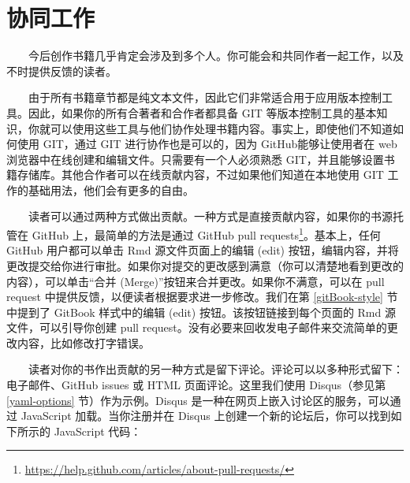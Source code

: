 \documentclass[
  12pt,
]{krantz}
\renewcommand{\href}[2]{#2\footnote{\url{#1}}}
\theoremstyle{definition}
\theoremstyle{definition}
\theoremstyle{definition}
\theoremstyle{definition}
\theoremstyle{remark}
\begin{document}
\hypertarget{collaboration}{%
\section{协同工作}\label{collaboration}}

  今后创作书籍几乎肯定会涉及到多个人。你可能会和共同作者一起工作，以及不时提供反馈的读者。

  由于所有书籍章节都是纯文本文件，因此它们非常适合用于应用版本控制工具。因此，如果你的所有合著者和合作者都具备 GIT 等版本控制工具的基本知识，你就可以使用这些工具与他们协作处理书籍内容。事实上，即使他们不知道如何使用 GIT，通过 GIT 进行协作也是可以的，因为 GitHub能够让使用者在 web 浏览器中在线创建和编辑文件。只需要有一个人必须熟悉 GIT，并且能够设置书籍存储库。其他合作者可以在线贡献内容，不过如果他们知道在本地使用 GIT 工作的基础用法，他们会有更多的自由。

  读者可以通过两种方式做出贡献。一种方式是直接贡献内容，如果你的书源托管在 GitHub 上，最简单的方法是通过 \href{https://help.github.com/articles/about-pull-requests/}{GitHub pull requests}。基本上，任何 GitHub 用户都可以单击 Rmd 源文件页面上的编辑 (edit) 按钮，编辑内容，并将更改提交给你进行审批。如果你对提交的更改感到满意（你可以清楚地看到更改的内容），可以单击``合并 (Merge)''按钮来合并更改。如果你不满意，可以在 pull request 中提供反馈，以便读者根据要求进一步修改。我们在第 \ref{gitBook-style} 节中提到了 GitBook 样式中的编辑 (edit) 按钮。该按钮链接到每个页面的 Rmd 源文件，可以引导你创建 pull request。没有必要来回收发电子邮件来交流简单的更改内容，比如修改打字错误。

  读者对你的书作出贡献的另一种方式是留下评论。评论可以以多种形式留下：电子邮件、GitHub issues 或 HTML 页面评论。这里我们使用 Disqus（参见第 \ref{yaml-options} 节）作为示例。Disqus 是一种在网页上嵌入讨论区的服务，可以通过 JavaScript 加载。当你注册并在 Disqus 上创建一个新的论坛后，你可以找到如下所示的 JavaScript 代码：
\end{document}
